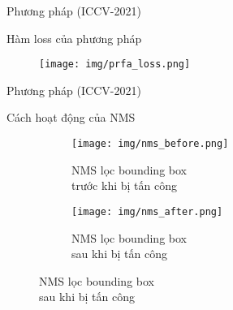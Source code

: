 \documentclass[aspectratio=169, 12pt]{beamer}
\begin{document}
\begin{frame}{Phương pháp \prfa (ICCV-2021)}

\begin{spacing}{1}

Hàm loss của phương pháp \prfa

\begin{minipage}{0.01\textwidth}
\end{minipage}
%
\hfill
\begin{minipage}{0.9\textwidth}
\begin{figure}[h]
\texttt{[image: img/prfa\_loss.png]}
\end{figure}
\end{minipage}








\end{spacing}
\end{frame}


\begin{frame}{Phương pháp \prfa (ICCV-2021)}

    Cách hoạt động của NMS
    
\begin{figure}[!hbpt]

\begin{subfigure}{.5\textwidth}
  \texttt{[image: img/nms\_before.png]}
  \caption{NMS lọc bounding box \\
  trước khi bị tấn công}
  \label{fig:nms_before}
\end{subfigure}%
\begin{subfigure}{.5\textwidth}
  \centering
  \texttt{[image: img/nms\_after.png]}
  \caption{NMS lọc bounding box \\
  sau khi bị tấn công}
  \label{fig:nms_after}
\end{subfigure}

\end{figure}
    
\end{frame}
 
\end{document}
